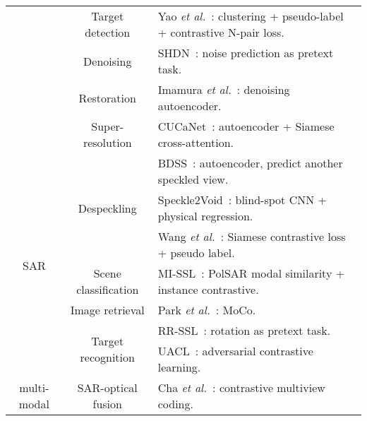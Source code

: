 \documentclass[lettersize,journal]{IEEEtran}
\newcommand{\etal}{\textit{et al.}}
\begin{document}
\begin{table*}
{\begin{tabular}{|c|c|l|}
                                 & Target detection                              & Yao \etal~\cite{yao2021self}: clustering + pseudo-label + contrastive N-pair loss.              \\ \cline{2-3} 
                                 & Denoising                                     & SHDN~\cite{wang2021self}: noise prediction as pretext task.                                     \\ \cline{2-3} 
                                 & Restoration                                   & Imamura \etal~\cite{imamura2019self}: denoising autoencoder.                                    \\ \cline{2-3} 
                                 & Super-resolution                              & CUCaNet~\cite{yao2020cross}: autoencoder + Siamese cross-attention.                             \\ \hline
\multirow{7}{*}{SAR}             & \multirow{3}{*}{Despeckling}                  & BDSS~\cite{yuan2019blind}: autoencoder, predict another speckled view.                          \\
                                 &                                               & Speckle2Void~\cite{molini2021speckle2void}: blind-spot CNN + physical regression.               \\
                                 &                                               & Wang \etal~\cite{wang2021sar}: Siamese contrastive loss + pseudo label.                         \\ \cline{2-3} 
                                 & Scene classification                          & MI-SSL~\cite{ren2021mutual}: PolSAR modal similarity + instance contrastive.                    \\ \cline{2-3} 
                                 & Image retrieval                               & Park \etal~\cite{park2021homography}: MoCo.                                                     \\ \cline{2-3} 
                                 & \multirow{2}{*}{Target recognition}           & RR-SSL~\cite{zhang2019rotation}: rotation as pretext task.                                      \\
                                 &                                               & UACL~\cite{xu2021adversarial}: adversarial contrastive learning.                                \\ \hline
\multirow{8}{*}{multi-modal}     & \multirow{3}{*}{SAR-optical fusion}           & Cha \etal~\cite{cha2021contrastive}: contrastive multiview coding.                              \\

\end{tabular}}
\end{table*}
\end{document}

